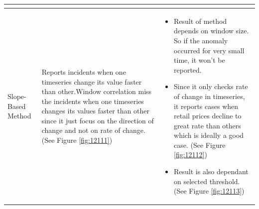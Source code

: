 \documentclass[a4paper,10pt]{article}
\begin{document}
\begin{table}[H]
{\begin{tabular}{|L{3cm} | L{5cm} | L{8cm}|}
\begin{itemize}
                                                                                                                                                                                                                                                                                                              \end{itemize}
 \\ \hline
Slope-Based Method                    & Reports incidents when one timeseries change its value faster than other.Window correlation miss the incidents when one timeseries changes its values faster than other since it just focus on the direction of change and not on rate of change. (See Figure \ref{fig:12111})     & \begin{itemize}
                                                                                                                                                                                                                                                                                                                  \item Result of method depends on window size. So if the anomaly occurred for very small time, it won't be reported.
                                                                                                                                                                                                                                                                                                                  \item Since it only checks rate of change in timeseries, it reports cases when retail prices decline to great rate than others which is ideally a good case. (See Figure \ref{fig:12112})
                                                                                                                                                                                                                                                                                                                  \item Result is also dependant on selected threshold. (See Figure \ref{fig:12113})
                                                                                                                                                                                                                                                                                                                 \end{itemize}
 \\ \hline

\end{tabular}}
\end{table}
\end{document}
